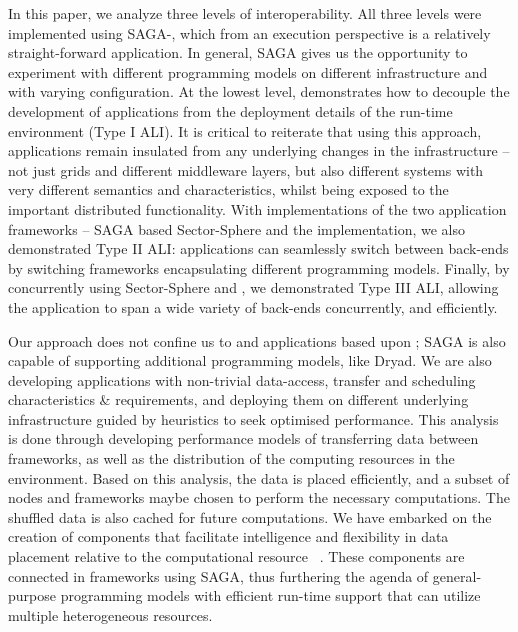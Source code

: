 \documentclass[3p,twocolumn]{elsarticle}
\begin{document}
In this paper, we analyze three levels of interoperability.  All three levels
were implemented using SAGA-\mr, which from an
execution perspective is a relatively straight-forward application.
In general, SAGA gives us the opportunity to experiment with different
programming models on different infrastructure and with varying
configuration. At the lowest level, \sagamapreduce demonstrates how to
decouple the development of applications from the deployment details
of the run-time environment (Type I ALI).  It is critical to reiterate
that using this approach, applications remain insulated from any
underlying changes in the infrastructure -- not just grids and
different middleware layers, but also different systems with very
different semantics and characteristics, whilst being exposed to the
important distributed functionality.
With implementations of the two application frameworks -- SAGA based
Sector-Sphere and the \smr implementation, we also demonstrated Type
II ALI: applications can seamlessly switch between back-ends by
switching frameworks encapsulating different programming models.
Finally, by concurrently using Sector-Sphere \mr and \smr, we
demonstrated Type III ALI, allowing the application to span a wide
variety of back-ends concurrently, and efficiently.

Our approach does not confine us to \mr and applications based upon
\mr; SAGA is also capable of supporting additional programming models,
like Dryad.  We are also developing applications with non-trivial
data-access, transfer and scheduling characteristics \& requirements,
and deploying them on different underlying infrastructure guided by
heuristics to seek optimised performance.
This analysis is done through developing performance models of
transferring data between frameworks, as well as the distribution of
the computing resources in the environment. Based on this analysis,
the data is placed efficiently, and a subset of nodes and frameworks
maybe chosen to perform the necessary computations. The shuffled data
is also cached for future computations.  We have embarked on the
creation of components that facilitate intelligence and flexibility in
data placement relative to the computational resource
~\cite{saga_dic_royalsoc09}. These components are connected in
frameworks using SAGA, thus furthering the agenda of general-purpose
programming models with efficient run-time support that can utilize
multiple heterogeneous resources.
\end{document}
